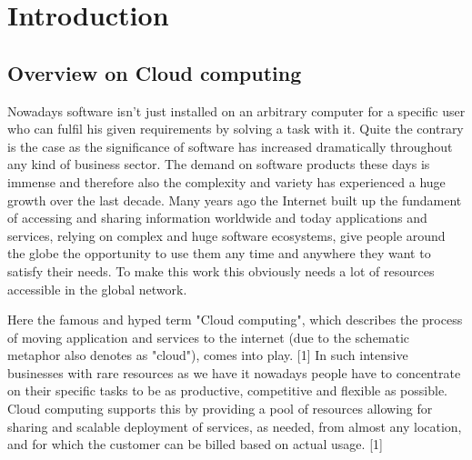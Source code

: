 \chapter{Introduction}
\label{chap:introduction}

\section{Overview on Cloud computing}

Nowadays software isn't just installed on an arbitrary computer for a specific user who can fulfil his given requirements by solving a task with it. Quite the contrary is the case as the significance of software has increased dramatically throughout any kind of business sector. The demand on software products these days is immense and therefore also the complexity and variety has experienced a huge growth over the last decade. Many years ago the Internet built up the fundament of accessing and sharing information worldwide and today applications and services, relying on complex and huge software ecosystems, give people around the globe the opportunity to use them any time and anywhere they want to satisfy their needs. To make this work this obviously needs a lot of resources accessible in the global network. 

Here the famous and hyped term "Cloud computing", which describes the process of moving application and services to the internet (due to the schematic metaphor also denotes as "cloud"), comes into play. [1] In such intensive businesses with rare resources as we have it nowadays people have to concentrate on their specific tasks to be as productive, competitive and flexible as possible. Cloud computing supports this by providing a pool of resources allowing for sharing and scalable deployment of services, as needed, from almost any location, and for which the customer can be billed based on actual usage. [1] 

